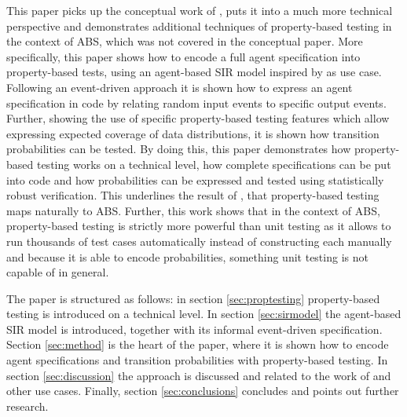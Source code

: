 This paper picks up the conceptual work of \cite{thaler_show_2019}, puts it into a much more technical perspective and demonstrates additional techniques of property-based testing in the context of ABS, which was not covered in the conceptual paper. More specifically, this paper shows how to encode a full agent specification into property-based tests, using an agent-based SIR model inspired by \cite{macal_agent-based_2010} as use case. Following an event-driven approach it is shown how to express an agent specification in code by relating random input events to specific output events. Further, showing the use of specific property-based testing features which allow expressing expected coverage of data distributions, it is shown how transition probabilities can be tested. By doing this, this paper demonstrates how property-based testing works on a technical level, how complete specifications can be put into code and how probabilities can be expressed and tested using statistically robust verification. This underlines the result of \cite{thaler_show_2019}, that property-based testing maps naturally to ABS. Further, this work shows that in the context of ABS, property-based testing is strictly more powerful than unit testing as it allows to run thousands of test cases automatically instead of constructing each manually and because it is able to encode probabilities, something unit testing is not capable of in general.

The paper is structured as follows: in section \ref{sec:proptesting} property-based testing is introduced on a technical level. In section \ref{sec:sirmodel} the agent-based SIR model is introduced, together with its informal event-driven specification. Section \ref{sec:method} is the heart of the paper, where it is shown how to encode agent specifications and transition probabilities with property-based testing. In section \ref{sec:discussion} the approach is discussed and related to the work of \cite{thaler_show_2019} and other use cases. Finally, section \ref{sec:conclusions} concludes and points out further research.